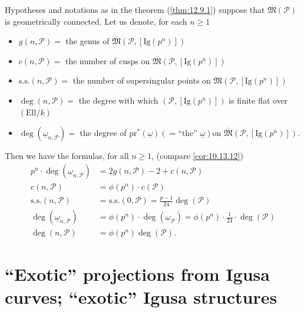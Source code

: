 \begin{kcor}\label{cor:12.9.4}
Hypotheses and notations as in the theorem (\ref{thm:12.9.1}) suppose that $\overline{\mathfrak{M}}(\mathcal{P})$ is geometrically connected. Let us denote, for each $n \ge 1$
\begin{itemize}[leftmargin=2.5em, itemsep=2pt, topsep=3pt]
\item $g(n, \mathcal{P}) = {}$ the genus of $\overline{\mathfrak{M}}(\mathcal{P}, [\mathrm{Ig}(p^n)])$
\item $c(n, \mathcal{P}) = {}$ the number of cusps on $\overline{\mathfrak{M}}(\mathcal{P}, [\mathrm{Ig}(p^n)])$
\item $\mathrm{s.s.}(n, \mathcal{P}) = {}$ the number of supersingular points on $\overline{\mathfrak{M}}(\mathcal{P}, [\mathrm{Ig}(p^n)])$
\item $\deg(n, \mathcal{P}) = {}$ the degree with which $(\mathcal{P}, [\mathrm{Ig}(p^n)])$ is finite flat over $(\mathrm{Ell}/k)$
\item $\deg(\underline{\omega}_{n, \mathcal{P}}) = {}$ the degree of $\mathrm{pr}^*(\underline{\omega}) (= \text{``the'' } \underline{\omega})$\linebreak on $\overline{\mathfrak{M}}(\mathcal{P}, [\mathrm{Ig}(p^n)])$.
\end{itemize}
Then we have the formulas, for all $n \ge 1$, (compare \ref{cor:10.13.12})
\begin{align*}
p^n \cdot \deg(\underline{\omega}_{n, \mathcal{P}}) &= 2g(n, \mathcal{P}) - 2 + c(n, \mathcal{P}) \\
c(n, \mathcal{P}) &= \phi(p^n) \cdot c(\mathcal{P}) \\
\mathrm{s.s.}(n, \mathcal{P}) &= \mathrm{s.s.}(0, \mathcal{P}) = \frac{p-1}{24} \deg(\mathcal{P}) \\
\deg(\underline{\omega}_{n, \mathcal{P}}) &= \phi(p^n) \cdot \deg(\underline{\omega}_{\mathcal{P}}) = \phi(p^n) \cdot \frac{1}{24} \cdot \deg(\mathcal{P}) \\
\deg(n, \mathcal{P}) &= \phi(p^n) \deg(\mathcal{P}) .
\end{align*}
\end{kcor}

\section{\texorpdfstring{``Exotic''}{"Exotic"} projections from Igusa curves; \texorpdfstring{``exotic''}{"exotic"} Igusa structures}
\label{sec:12.10}

